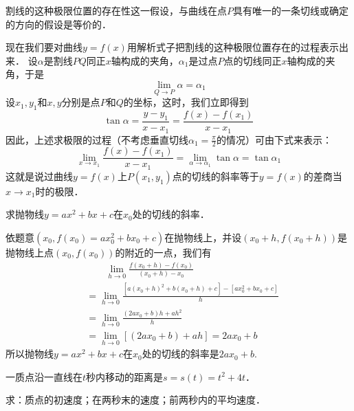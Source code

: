 割线的这种极限位置的存在性这一假设，与曲线在点$P$具有唯一的一条切线或确定的方向的假设是等价的．

现在我们要对曲线$y=f(x)$用解析式子把割线的这种极限位置存在的过程表示出来．
设$\alpha$是割线$PQ$同正$x$轴构成的夹角，$\alpha_1$是过点$P$点的切线同正$x$轴构成的夹角，于是
\[\lim_{Q\to P}\alpha=\alpha_1\]
设$x_1,y_1$和$x,y$分别是点$P$和$Q$的坐标，这时，我们立即得到
\[\tan\alpha=\frac{y-y_1}{x-x_1}=\frac{f(x)-f(x_1)}{x-x_1}\]
因此，上述求极限的过程（不考虑垂直切线$\alpha_1=\frac{\pi}{2}$的情况）可由下式来表示：
\[\lim_{x\to x_1}\frac{f(x)-f(x_1)}{x-x_1}=\lim_{\alpha\to \alpha_1}\tan\alpha=\tan\alpha_1\]
这就是说过曲线$y=f(x)$上$P(x_1,y_1)$点的切线的斜率等于$y=f(x)$的差商当$x\to x_1$时的极限．

\begin{example}
    求抛物线$y=ax^2+bx+c$在$x_0$处的切线的斜率．
\end{example}

\begin{solution}
    依题意$(x_0,f(x_0)=ax_0^2+bx_0+c)$在抛物线上，并设$(x_0+h,f(x_0+h))$是抛物线上点$(x_0,f(x_0))$的附近的一点，我们有
\begin{align*}
&\qquad \lim_{h\to 0}\frac{f(x_0+h)-f(x_0)}{(x_0+h)-x_0}\\
&=\lim_{h\to 0}\frac{[a(x_0+h)^2+b(x_0+h)+c]-[ax^2_0+bx_0+c]}{h}    \\
&=\lim_{h\to 0}\frac{(2ax_0+b)h+ah^2}{h}\\
&=\lim_{h\to 0}[(2ax_0+b)+ah]=2ax_0+b
\end{align*}
所以抛物线$y=ax^2+bx+c$在$x_0$处的切线的斜率是$2ax_0+b$.
\end{solution}

\begin{example}
    一质点沿一直线在$t$秒内移动的距离是$s=s(t)=t^2+4t$．
    
    求：质点的初速度；在两秒末的速度；前两秒内的平均速度．
\end{example}

